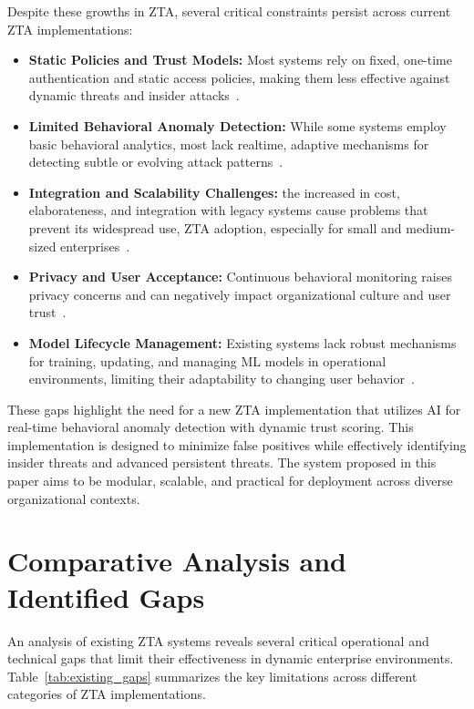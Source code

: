 \documentclass[conference]{IEEEtran}
\begin{document}
Despite these growths in ZTA, several critical constraints persist
across current ZTA implementations:
\begin{itemize}
    \item \textbf{Static Policies and Trust Models:} Most systems rely on
fixed, one-time authentication and static access policies,
making them less effective against dynamic threats and
insider attacks~\cite{yadav2023behavioral, ahmadi2023identity, gambo2023systematic}.
    \item \textbf{Limited Behavioral Anomaly Detection:} While some
systems employ basic behavioral analytics, most lack realtime, adaptive mechanisms for detecting subtle or evolving
attack patterns~\cite{yadav2023behavioral, elsayed2023iot, hasan2023insider}.
    \item \textbf{Integration and Scalability Challenges:} the increased in cost, elaborateness, and integration with legacy systems cause problems that prevent its widespread use,
ZTA adoption, especially for small and medium-sized
enterprises~\cite{wang2023aws, gambo2023systematic, weinberg2023survey}.
    \item \textbf{Privacy and User Acceptance:} Continuous behavioral
monitoring raises privacy concerns and can negatively
impact organizational culture and user trust~\cite{yadav2023behavioral, ahmadi2023identity}.
    \item \textbf{Model Lifecycle Management:} Existing systems lack
robust mechanisms for training, updating, and managing
ML models in operational environments, limiting their
adaptability to changing user behavior~\cite{obbu2023cloud, elsayed2023iot}.
\end{itemize}

These gaps highlight the need for a new ZTA implementation that utilizes AI for real-time behavioral anomaly detection with dynamic trust scoring. This implementation is designed to minimize false positives while effectively identifying insider threats and advanced persistent threats. The system proposed in this paper aims to be
modular, scalable, and practical for deployment across diverse
organizational contexts.

\section{Comparative Analysis and Identified Gaps}
An analysis of existing ZTA systems reveals several critical operational and technical gaps that limit their effectiveness in dynamic enterprise environments. Table~\ref{tab:existing_gaps} summarizes the key limitations across different categories of ZTA implementations.
\end{document}
